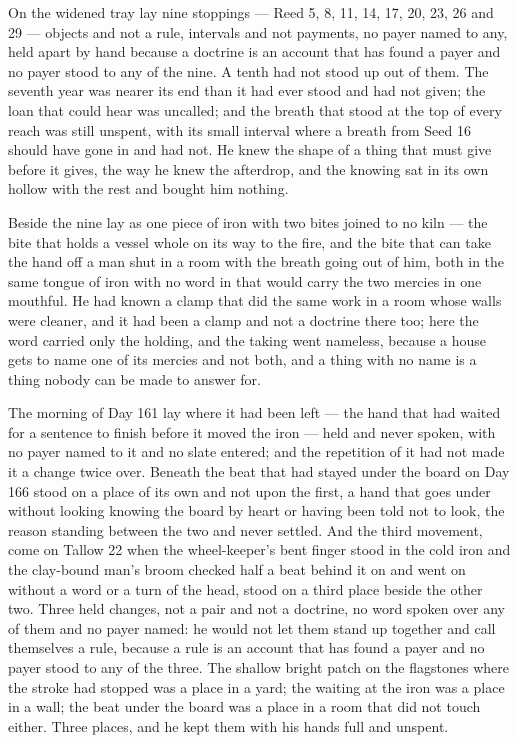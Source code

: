 On the widened tray lay nine stoppings --- Reed 5, 8, 11, 14, 17, 20, 23, 26 and 29 --- objects and not a rule, intervals and not payments, no payer named to any, held apart by hand because a doctrine is an account that has found a payer and no payer stood to any of the nine. A tenth had not stood up out of them. The seventh year was nearer its end than it had ever stood and had not given; the loan that could hear was uncalled; and the breath that stood at the top of every reach was still unspent, with its small interval where a breath from Seed 16 should have gone in and had not. He knew the shape of a thing that must give before it gives, the way he knew the afterdrop, and the knowing sat in its own hollow with the rest and bought him nothing.

\scenebreak

Beside the nine lay  as one piece of iron with two bites joined to no kiln --- the bite that holds a vessel whole on its way to the fire, and the bite that can take the hand off a man shut in a room with the breath going out of him, both in the same tongue of iron with no word in  that would carry the two mercies in one mouthful. He had known a clamp that did the same work in a room whose walls were cleaner, and it had been a clamp and not a doctrine there too; here the word carried only the holding, and the taking went nameless, because a house gets to name one of its mercies and not both, and a thing with no name is a thing nobody can be made to answer for.

The morning of Day 161 lay where it had been left --- the hand that had waited for a sentence to finish before it moved the iron --- held and never spoken, with no payer named to it and no slate entered; and the repetition of it had not made it a change twice over. Beneath  the beat that had stayed under the board on Day 166 stood on a place of its own and not upon the first, a hand that goes under without looking knowing the board by heart or having been told not to look, the reason standing between the two and never settled. And the third movement, come on Tallow 22 when the wheel-keeper's bent finger stood in the cold iron and the clay-bound man's broom checked half a beat behind it on  and went on without a word or a turn of the head, stood on a third place beside the other two. Three held changes, not a pair and not a doctrine, no word spoken over any of them and no payer named: he would not let them stand up together and call themselves a rule, because a rule is an account that has found a payer and no payer stood to any of the three. The shallow bright patch on the flagstones where the stroke had stopped was a place in a yard; the waiting at the iron was a place in a wall; the beat under the board was a place in a room that did not touch either. Three places, and he kept them with his hands full and unspent.

